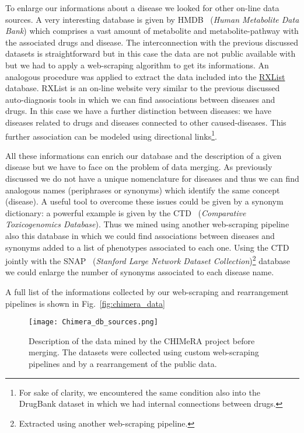 \documentclass{standalone}
\begin{document}
To enlarge our informations about a disease we looked for other on-line data sources.
A very interesting database is given by HMDB~\cite{HMDB} (\emph{Human Metabolite Data Bank}) which comprises a vast amount of metabolite and metabolite-pathway with the associated drugs and disease.
The interconnection with the previous discussed datasets is straightforward but in this case the data are not public available with but we had to apply a web-scraping algorithm to get its informations.
An analogous procedure was applied to extract the data included into the \href{https://www.rxlist.com/script/main/hp.asp}{RXList} database.
RXList is an on-line website very similar to the previous discussed auto-diagnosis tools in which we can find associations between diseases and drugs.
In this case we have a further distinction between diseases: we have diseases related to drugs and diseases connected to other caused-diseases.
This further association can be modeled using directional links\footnote{
  For sake of clarity, we encountered the same condition also into the DrugBank dataset in which we had internal connections between drugs.
}.

All these informations can enrich our database and the description of a given disease but we have to face on the problem of data merging.
As previously discussed we do not have a unique nomenclature for diseases and thus we can find analogous names (periphrases or synonyms) which identify the same concept (disease).
A useful tool to overcome these issues could be given by a synonym dictionary: a powerful example is given by the CTD~\cite{CTDdb} (\emph{Comparative Toxicogenomics Database}).
Thus we mined using another web-scraping pipeline also this database in which we could find associations between diseases and synonyms added to a list of phenotypes associated to each one.
Using the CTD jointly with the SNAP~\cite{biosnapnets} (\emph{Stanford Large Network Dataset Collection})\footnote{
  Extracted using another web-scraping pipeline.
} database we could enlarge the number of synonyms associated to each disease name.

A full list of the informations collected by our web-scraping and rearrangement pipelines is shown in Fig.~\ref{fig:chimera_data}

\begin{figure}[htbp]
\centering
\texttt{[image: Chimera\_db\_sources.png]}
\caption{Description of the data mined by the CHIMeRA project before merging.
The datasets were collected using custom web-scraping pipelines and by a rearrangement of the public data.
}
\label{fig:chimera_net}
\end{figure}
\end{document}
